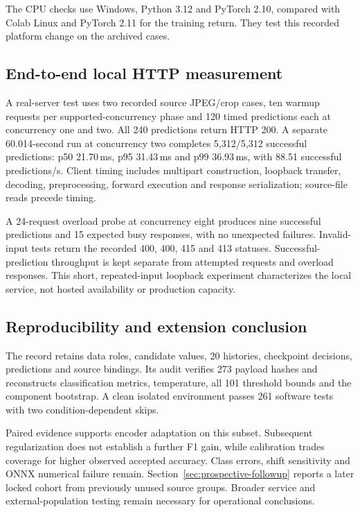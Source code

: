 The CPU checks use Windows, Python 3.12 and PyTorch 2.10, compared with Colab Linux and PyTorch 2.11 for the training return. They test this recorded platform change on the archived cases.

\subsection{End-to-end local HTTP measurement}
A real-server test uses two recorded source JPEG/crop cases, ten warmup requests per supported-concurrency phase and 120 timed predictions each at concurrency one and two. All 240 predictions return HTTP 200. A separate 60.014-second run at concurrency two completes 5,312/5,312 successful predictions: p50 21.70\,ms, p95 31.43\,ms and p99 36.93\,ms, with 88.51 successful predictions/s. Client timing includes multipart construction, loopback transfer, decoding, preprocessing, forward execution and response serialization; source-file reads precede timing.

A 24-request overload probe at concurrency eight produces nine successful predictions and 15 expected busy responses, with no unexpected failures. Invalid-input tests return the recorded 400, 400, 415 and 413 statuses. Successful-prediction throughput is kept separate from attempted requests and overload responses. This short, repeated-input loopback experiment characterizes the local service, not hosted availability or production capacity.

\subsection{Reproducibility and extension conclusion}
The record retains data roles, candidate values, 20 histories, checkpoint decisions, predictions and source bindings. Its audit verifies 273 payload hashes and reconstructs classification metrics, temperature, all 101 threshold bounds and the component bootstrap. A clean isolated environment passes 261 software tests with two condition-dependent skips.

Paired evidence supports encoder adaptation on this subset. Subsequent regularization does not establish a further F1 gain, while calibration trades coverage for higher observed accepted accuracy. Class errors, shift sensitivity and ONNX numerical failure remain. Section~\ref{sec:prospective-followup} reports a later locked cohort from previously unused source groups. Broader service and external-population testing remain necessary for operational conclusions.
